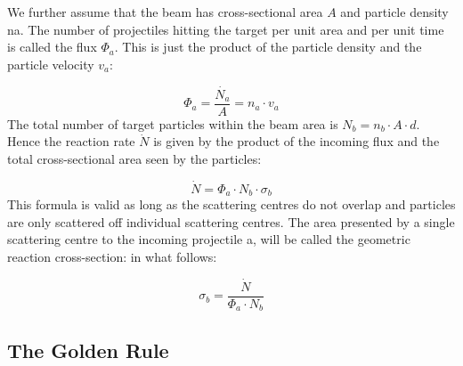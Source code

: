 \documentclass[10pt,a4paper]{article}
\begin{document}
We further assume that the beam has cross-sectional area $A$ and particle density na. The number of projectiles hitting the target per unit area and per unit time is called the flux $\Phi_a$. This is just the product of the particle density and the particle velocity $v_a$:

\begin{equation}
    \Phi_a = \frac{\dot{N_a}}{A}=n_a\cdot v_a
\end{equation}
The total number of target particles within the beam area is $N_b = n_b\cdot A\cdot d$. Hence the reaction rate $\dot{N}$ is given by the product of the incoming flux and the total cross-sectional area seen by the particles:

\begin{equation} 
    \dot{N}=\Phi_a\cdot N_b \cdot \sigma_b
\end{equation}
This formula is valid as long as the scattering centres do not overlap and particles are only scattered off individual scattering centres. The area presented by a single scattering centre to the incoming projectile a, will be called the geometric reaction cross-section: in what follows:

\begin{equation}
    \sigma_b = \frac{\dot{N}}{\Phi_a\cdot N_b}
\end{equation}

\subsection{{The Golden Rule}}
\end{document}
